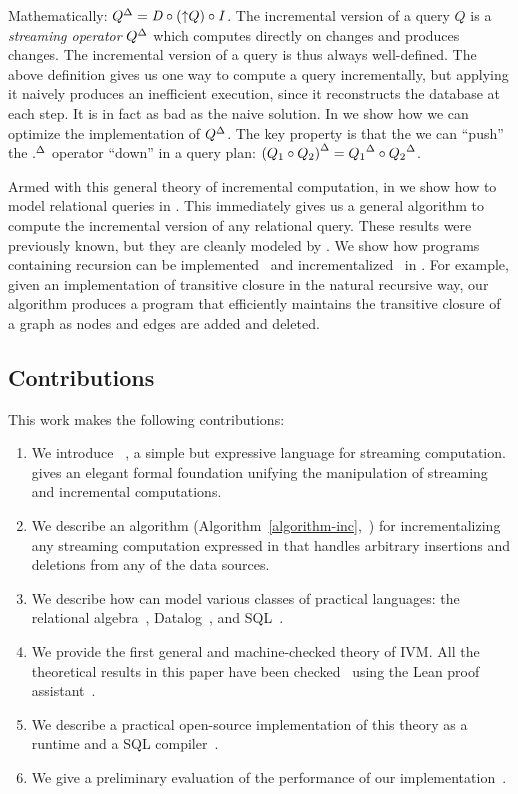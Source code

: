 %
Mathematically: ${Q}^{\Delta} = \mathit{D} \circ ({\uparrow}Q) \circ \mathit{I}$.  The
incremental version of a query $Q$ is a \emph{streaming operator}
${Q}^{\Delta}$ which computes directly on changes and produces changes.
The incremental version of a query is thus always well-defined.  The
above definition gives us one way to compute a query incrementally,
but applying it naively produces an inefficient execution, since it
reconstructs the database at each step.  It is in fact as bad as the
naive solution.  In  we show how we can
optimize the implementation of ${Q}^{\Delta}$. The key property is that the
we can ``push'' the ${.}^{\Delta}$ operator ``down'' in a query plan:
${(Q_1 \circ Q_2)}^{\Delta} = {Q_1}^{\Delta} \circ {Q_2}^{\Delta}$.

Armed with this general theory of incremental computation, in
 we show how to model relational queries in
\dbsp.  This immediately gives us a general algorithm to compute the
incremental version of any relational query.  These results were
previously known, but they are cleanly modeled by \dbsp.  We show how
programs containing recursion can be
implemented~ and
incrementalized~ in \dbsp.  For example, given an
implementation of transitive closure in the natural recursive way, our
algorithm produces a program that efficiently maintains the transitive
closure of a graph as nodes and edges are added and deleted.

\vspace{-3ex}

\subsection{Contributions}

This work makes the following contributions:
\begin{enumerate}
  \item We introduce \dbsp~, a simple but
    expressive language for streaming computation. \dbsp gives an
    elegant formal foundation unifying the manipulation of streaming
    and incremental computations.
  \item We describe an algorithm
    (Algorithm~\ref{algorithm-inc},~) for
    incrementalizing any streaming computation expressed in \dbsp
    that handles arbitrary insertions and deletions from any of the
    data sources.
  \item We describe how \dbsp can model various classes of practical
    languages: the relational algebra~,
    Datalog~, and SQL~.
  \item We provide the first general and machine-checked theory of
    IVM.  All the theoretical results in this paper have been
    checked~\cite{dbsp-theory} using the Lean proof
    assistant~\cite{moura-cade15}.
  \item We describe a practical open-source implementation of this
    theory as a runtime and a SQL
    compiler~.
  \item We give a preliminary evaluation of the performance of our
    implementation~.
\end{enumerate}
